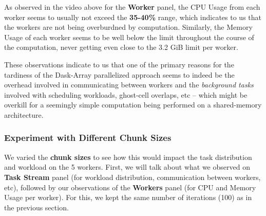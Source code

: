 \documentclass[a4paper,12pt]{article}
\begin{document}
As observed in the video above for the \textbf{Worker} panel, the CPU Usage from each worker seems to usually not exceed the \textbf{35-40\%} range, which indicates to us that the workers are not being overburdned by computation. Similarly, the Memory Usage of each worker seems to be well below the limit throughout the course of the computation, never getting even close to the 3.2 GiB limit per worker.

These observations indicate to us that one of the primary reasons for the tardiness of the Dask-Array parallelized approach seems to indeed be the overhead involved in communicating between workers and the \textit{background tasks} involved with scheduling workloads, ghost-cell overlaps, etc -- which might be overkill for a seemingly simple computation being performed on a shared-memory architecture.

\subsubsection{Experiment with Different Chunk Sizes}
We varied the \textbf{chunk sizes} to see how this would impact the task distribution and workload on the 5 workers. First, we will talk about what we observed on \textbf{Task Stream} panel (for workload distribution, communication between workers, etc), followed by our observations of the \textbf{Workers} panel (for CPU and Memory Usage per worker). For this, we kept the same number of iterations (100) as in the previous section.
\end{document}
